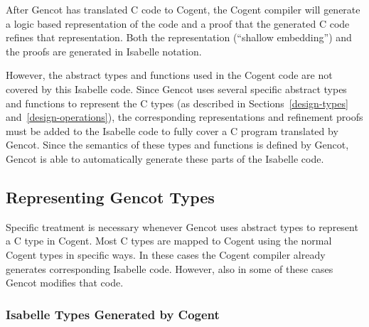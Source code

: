 After Gencot has translated C code to Cogent, the Cogent compiler will generate a logic
based representation of the code and a proof that the generated C code refines that representation.
Both the representation (``shallow embedding'') and the proofs are generated in Isabelle notation. 

However, the abstract types and functions used in the Cogent code are not covered by this Isabelle 
code. Since Gencot uses several specific abstract types and functions to represent the C types (as 
described in Sections~\ref{design-types} and~\ref{design-operations}), the corresponding representations
and refinement proofs must be added to the Isabelle code to fully cover a C program translated by 
Gencot. Since the semantics of these types and functions is defined by Gencot, Gencot is able to 
automatically generate these parts of the Isabelle code.

\subsection{Representing Gencot Types}
\label{design-isabelle-types}

Specific treatment is necessary whenever Gencot uses abstract types to represent a C type in Cogent.
Most C types are mapped to Cogent using the normal Cogent types in specific ways. In these cases the 
Cogent compiler already generates corresponding Isabelle code. However, also in some of these cases 
Gencot modifies that code.

\subsubsection{Isabelle Types Generated by Cogent}

